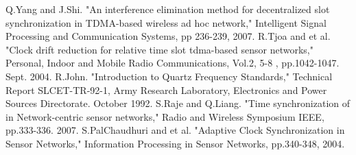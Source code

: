 \documentclass[journal]{IEEEtran}
\begin{document}
\begin{thebibliography}{\textbf{References}}
Q.Yang and J.Shi. "An interference elimination method for decentralized slot synchronization in TDMA-based wireless ad hoc network," Intelligent Signal Processing and Communication Systems, pp 236-239, 2007.
R.Tjoa and et al. "Clock drift reduction for relative time slot tdma-based sensor networks," Personal, Indoor and Mobile Radio Communications, Vol.2, 5-8 , pp.1042-1047. Sept. 2004.
R.John. "Introduction to Quartz Frequency Standards," Technical Report SLCET-TR-92-1, Army Research Laboratory, Electronics and Power Sources Directorate. October 1992.
S.Raje and Q.Liang. "Time synchronization of in Network-centric sensor networks," Radio and Wireless Symposium IEEE, pp.333-336. 2007.
S.PalChaudhuri and et al. "Adaptive Clock Synchronization in Sensor Networks," Information Processing in Sensor Networks, pp.340-348, 2004.
\end{thebibliography}
\end{document}
